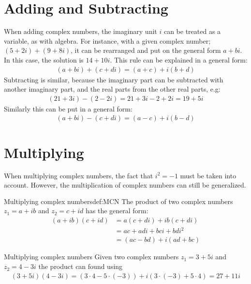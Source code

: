 \section{Adding and Subtracting}
When adding complex numbers, the imaginary unit $i$ can be treated as a variable, as with algebra. For instance, with a given complex number; $(5+2i)+(9+8i)$, it can be rearranged and put on the general form $a+bi$. In this case, the solution is $14+10i$. This rule can be explained in a general form: 
\begin{align*}
(a + bi) + (c + di) = (a + c) + i(b + d)
\end{align*}
Subtracting is similar, because the imaginary part can be subtracted with another imaginary part, and the real parts from the other real parts, e.g:
\begin{align*}
(21 + 3i) - (2 - 2i) = 21 + 3i - 2 + 2i = 19 + 5i
\end{align*}
Similarly this can be put in a general form:
\begin{align*}
(a + bi) - (c + di) = (a - c) + i(b - d)
\end{align*}

\section{Multiplying}
When multiplying complex numbers, the fact that $i^2 =-1$ must be taken into account. However, the multiplication of complex numbers can still be generalized. 
\begin{definition}{Multiplying complex numbers}{def:MCN}
The product of two complex numbers $z_1=a+ib$ and $z_2=c+id$ has the general form:
\begin{align*}
(a+ib)(c+id)&=a(c+di)+ib(c+di)
\\
&=ac+adi+bci+bdi^2
\\
&=(ac-bd)+i(ad+bc)
\end{align*}
\end{definition}
\begin{example}{Multiplying complex numbers}{}
Given two complex numbers $z_1=3+5i$ and $z_2=4-3i$ the product can found using 
\begin{align*}
(3+5i)(4-3i) = (3\cdot4-5\cdot(-3))+i(3\cdot(-3)+5\cdot4)=27+11i
\end{align*}
\end{example}



